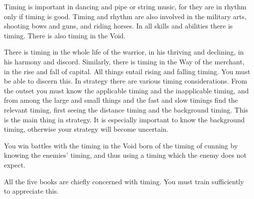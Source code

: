 \documentclass[12pt]{report}
\begin{document}
Timing is important in dancing and pipe or string music, for they are in rhythm only if timing is good. Timing and rhythm are also involved in the military arts, shooting bows and guns, and riding horses. In all skills and abilities there is timing. There is also timing in the Void.

There is timing in the whole life of the warrior, in his thriving and declining, in his harmony and discord. Similarly, there is timing in the Way of the merchant, in the rise and fall of capital. All things entail rising and falling timing. You must be able to discern this. In strategy there are various timing considerations. From the outset you must know the applicable timing and the inapplicable timing, and from among the large and small things and the fast and slow timings find the relevant timing, first seeing the distance timing and the background timing. This is the main thing in strategy. It is especially important to know the background timing, otherwise your strategy will become uncertain.

You win battles with the timing in the Void born of the timing of cunning by knowing the enemies' timing, and thus using a timing which the enemy does not expect.

All the five books are chiefly concerned with timing. You must train sufficiently to appreciate this.
\end{document}
